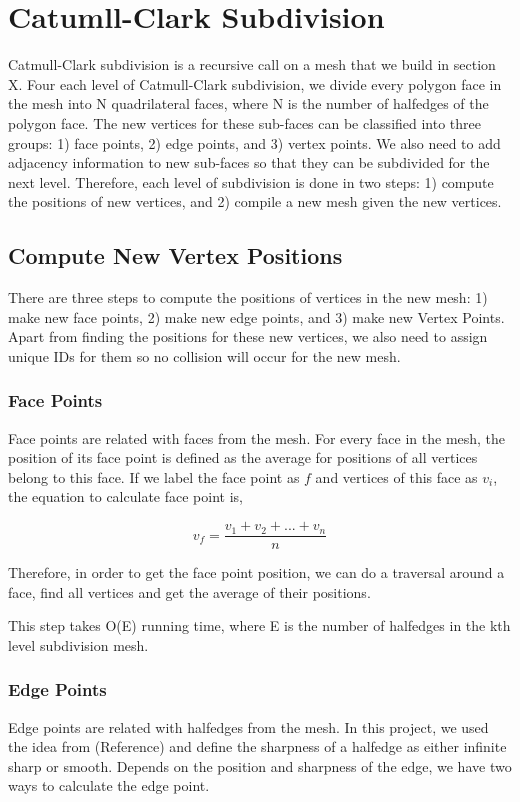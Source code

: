 \documentclass[12pt]{article}
\begin{document}
\newpage

\section{Catumll-Clark Subdivision} \label{sec:ccsd}

Catmull-Clark subdivision is a recursive call on a mesh that we build in section X. Four each level of Catmull-Clark subdivision, we divide every polygon face in the mesh into N quadrilateral faces, where N is the number of halfedges of the polygon face. The new vertices for these sub-faces can be classified into three groups: 1) face points, 2) edge points, and 3) vertex points. We also need to add adjacency information to new sub-faces so that they can be subdivided for the next level. Therefore, each level of subdivision is done in two steps: 1) compute the positions of new vertices, and 2) compile a new mesh given the new vertices.

\subsection{Compute New Vertex Positions}
There are three steps to compute the positions of vertices in the new mesh: 1) make new face points, 2) make new edge points, and 3) make new Vertex Points. Apart from finding the positions for these new vertices, we also need to assign unique IDs for them so no collision will occur for the new mesh.

\subsubsection{Face Points}
Face points are related with faces from the mesh. For every face in the mesh, the position of its face point is defined as the average for positions of all vertices belong to this face. If we label the face point as $f$ and vertices of this face as $v_i$, the equation to calculate face point is,

$$v_f = \frac{v_1 + v_2 + ... + v_n}{n}$$

Therefore, in order to get the face point position, we can do a traversal around a face, find all vertices and get the average of their positions.

This step takes O(E) running time, where E is the number of halfedges in the kth level subdivision mesh.

\subsubsection{Edge Points}
Edge points are related with halfedges from the mesh. In this project, we used the idea from (Reference) and define the sharpness of a halfedge as either infinite sharp or smooth. Depends on the position and sharpness of the edge, we have two ways to calculate the edge point. 
\end{document}
